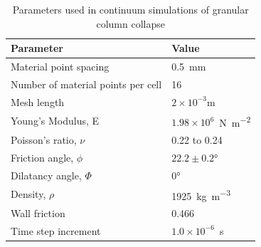 \begin{table}
\caption{Parameters used in continuum simulations of granular column collapse}
\label{table:MPMData}
\centering
\begin{tabular}{ll}
\toprule
\textbf{Parameter} & \textbf{Value} \\ \midrule
Material point spacing & 0.5~\si{\mm} \\
Number of material points per cell & 16 \\
Mesh length & $2\times10^{-3}\si{\m}$  \\
Young's Modulus, E & $1.98 \times 10 ^{6}$~\si{\N\per\m\squared} \\
Poisson's ratio, $\nu$ & 0.22 to 0.24 \\ 
Friction angle, $\phi$ & $22.2 \pm 0.2\si{\degree}$ \\
Dilatancy angle, $\varPhi$ & $0$\si{\degree} \\
Density, $\rho$ & 1925~\si{\kg\per\m\cubed}\\
Wall friction & 0.466 \\
Time step increment & $1.0 \times 10^{-6}$~\si{\second}\\ \bottomrule
\end{tabular}
\end{table}

